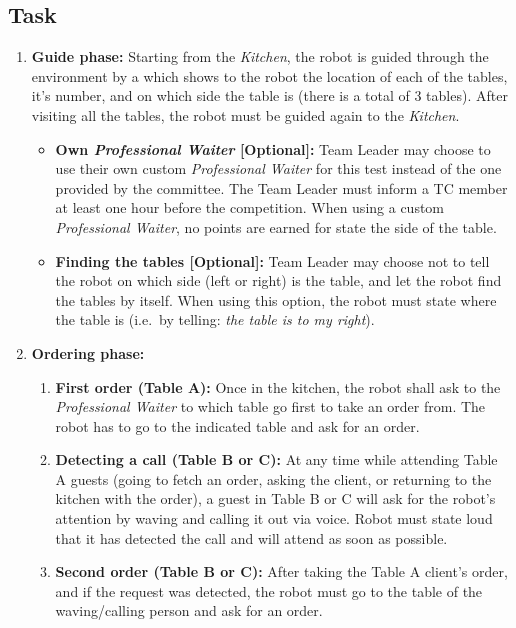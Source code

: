 \subsection{Task}
\begin{enumerate}

\item \textbf{Guide phase:} Starting from the \textit{Kitchen}, the robot is guided through the environment by a  which shows to the robot the location of each of the tables, it's number, and on which side the table is (there is a total of 3 tables). After visiting all the tables, the robot must be guided again to the \textit{Kitchen}.
\begin{itemize}
\item \textbf{Own \textit{Professional Waiter} [Optional]:} Team Leader may choose to use their own custom \textit{Professional Waiter} for this test instead of the one provided by the committee. The Team Leader must inform a TC member at least one hour before the competition. When using a custom \textit{Professional Waiter}, no points are earned for state the side of the table.
\item \textbf{Finding the tables [Optional]:} Team Leader may choose not to tell the robot on which side (left or right) is the table, and let the robot find the tables by itself. When using this option, the robot must state where the table is (i.e.~by telling: \textit{the table is to my right}).
\end{itemize}

\item \textbf{Ordering phase:}
\begin{enumerate}
\item \textbf{First order (Table A):} Once in the kitchen, the robot shall ask to the \textit{Professional Waiter} to which table go first to take an order from. The robot has to go to the indicated table and ask for an order.

\item \textbf{Detecting a call (Table B or C):} At any time while attending Table A guests (going to fetch an order, asking the client, or returning to the kitchen with the order), a guest in Table B or C will ask for the robot's attention by waving and calling it out via voice. Robot must state loud that it has detected the call and will attend as soon as possible.

\item \textbf{Second order (Table B or C):} After taking the Table A client's order, and if the request was detected, the robot must go to the table of the waving/calling person and ask for an order.


\end{enumerate}
\end{enumerate}
